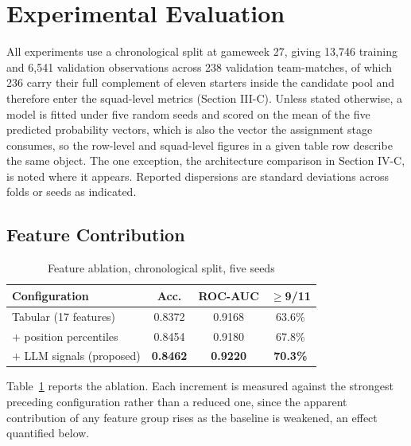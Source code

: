 \documentclass[conference]{IEEEtran}
\begin{document}
\section{Experimental Evaluation}

All experiments use a chronological split at gameweek 27, giving 13{,}746 training and 6{,}541 validation observations across 238 validation team-matches, of which 236 carry their full complement of eleven starters inside the candidate pool and therefore enter the squad-level metrics (Section III-C). Unless stated otherwise, a model is fitted under five random seeds and scored on the mean of the five predicted probability vectors, which is also the vector the assignment stage consumes, so the row-level and squad-level figures in a given table row describe the same object. The one exception, the architecture comparison in Section IV-C, is noted where it appears. Reported dispersions are standard deviations across folds or seeds as indicated.

\subsection{Feature Contribution}

\begin{table}[!t]
\centering
\small
\caption{Feature ablation, chronological split, five seeds}
\label{tab:ablation}
\begin{tabular}{@{}lccc@{}}
\toprule
\textbf{Configuration} & \textbf{Acc.} & \textbf{ROC-AUC} & \textbf{$\geq$9/11} \\
\midrule
Tabular (17 features)          & 0.8372 & 0.9168 & 63.6\% \\
$+$ position percentiles       & 0.8454 & 0.9180 & 67.8\% \\
$+$ LLM signals (proposed)     & \textbf{0.8462} & \textbf{0.9220} & \textbf{70.3\%} \\
\bottomrule
\end{tabular}
\end{table}

Table~\ref{tab:ablation} reports the ablation. Each increment is measured against the strongest preceding configuration rather than a reduced one, since the apparent contribution of any feature group rises as the baseline is weakened, an effect quantified below.
\end{document}
